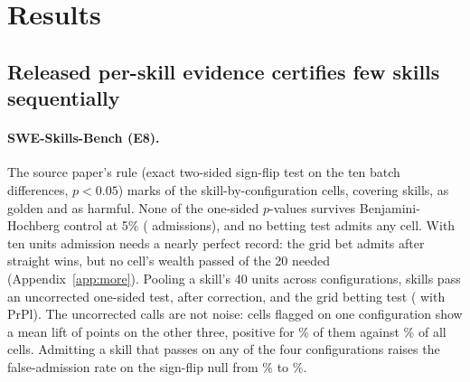 \section{Results}
\label{sec:results}

\subsection{Released per-skill evidence certifies few skills sequentially}
\label{sec:res-real}

\paragraph{SWE-Skills-Bench (E8).} The source paper's rule (exact two-sided sign-flip test on the ten batch differences, $p<0.05$) marks \NSweGolden{} of the \NSweCells{} skill-by-configuration cells, covering \NSweGoldenSkills{} skills, as golden and \NSweHarmful{} as harmful. None of the one-sided $p$-values survives Benjamini-Hochberg control at 5\% (\NSweBH{} admissions), and no betting test admits any cell. With ten units admission needs a nearly perfect record: the grid bet admits after \NSweGridMinAllOnes{} straight wins, but no cell's wealth passed \NSweObsWealthGrid{} of the 20 needed (Appendix~\ref{app:more}). Pooling a skill's 40 units across configurations, \NSwePooled{} skills pass an uncorrected one-sided test, \NSwePooledBH{} after correction, and \NSwePooledBet{} the grid betting test (\NSwePooledBetPrpl{} with PrPl). The uncorrected calls are not noise: cells flagged on one configuration show a mean lift of \NSweRepLift{} points on the other three, positive for \NSweRepPos\% of them against \NSweAllPos\% of all cells. Admitting a skill that passes on any of the four configurations raises the false-admission rate on the sign-flip null from \NShopPer\% to \NShopAny\%.

